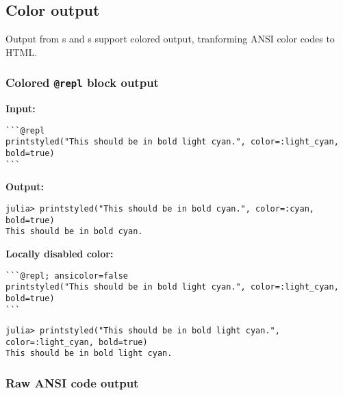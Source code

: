 \subsection{Color output}



\label{17347250707405175741}{}


Output from s and s support colored output, tranforming ANSI color codes to HTML.



\subsubsection{Colored \texttt{@repl} block output}



\label{681009610151884915}{}


\textbf{Input:}




\begin{verbatim}
```@repl
printstyled("This should be in bold light cyan.", color=:light_cyan, bold=true)
```
\end{verbatim}



\textbf{Output:}




\begin{verbatim}
julia> printstyled("This should be in bold cyan.", color=:cyan, bold=true)
This should be in bold cyan.
\end{verbatim}



\textbf{Locally disabled color:}




\begin{verbatim}
```@repl; ansicolor=false
printstyled("This should be in bold light cyan.", color=:light_cyan, bold=true)
```
\end{verbatim}




\begin{verbatim}
julia> printstyled("This should be in bold light cyan.", color=:light_cyan, bold=true)
This should be in bold light cyan.
\end{verbatim}



\subsubsection{Raw ANSI code output}



